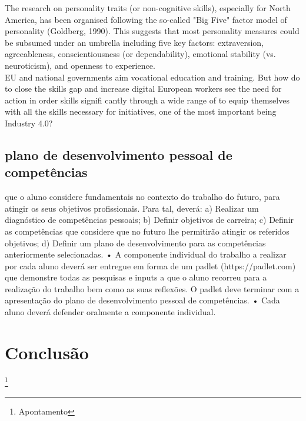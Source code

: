 The research on personality traits (or non-cognitive skills), especially for North America, has been organised following the so-called "Big Five" factor model of personality (Goldberg, 1990). This suggests that most personality measures could be subsumed under an umbrella including five key factors:
extraversion, agreeableness, conscientiousness (or dependability), emotional stability (vs. neuroticism), and openness to experience.\\


EU and national governments aim vocational education and training. But how do
to close the skills gap and increase digital European workers see the need for action in order skills signifi cantly through a wide range of to equip themselves with all the skills necessary for initiatives, one of the most important being Industry 4.0?




\subsection{plano de desenvolvimento pessoal de competências}

que o aluno considere
fundamentais no contexto do trabalho do futuro, para atingir os seus objetivos
profissionais. Para tal, deverá:
a) Realizar um diagnóstico de competências pessoais;
b) Definir objetivos de carreira;
c) Definir as competências que considere que no futuro lhe permitirão atingir os
referidos objetivos;
d) Definir um plano de desenvolvimento para as competências anteriormente
selecionadas.
• A componente individual do trabalho a realizar por cada aluno deverá ser entregue em forma de um padlet (https://padlet.com) que demonstre todas as pesquisas e inputs a que o aluno recorreu para a realização do trabalho bem como as suas reflexões. O padlet deve terminar com a apresentação do plano de
desenvolvimento pessoal de competências.
• Cada aluno deverá defender oralmente a componente individual.


\newpage
\section{Conclusão}
\newpage
%
%
\listoffigures
\cite{*}

\newpage
\footnote{Apontamento}


